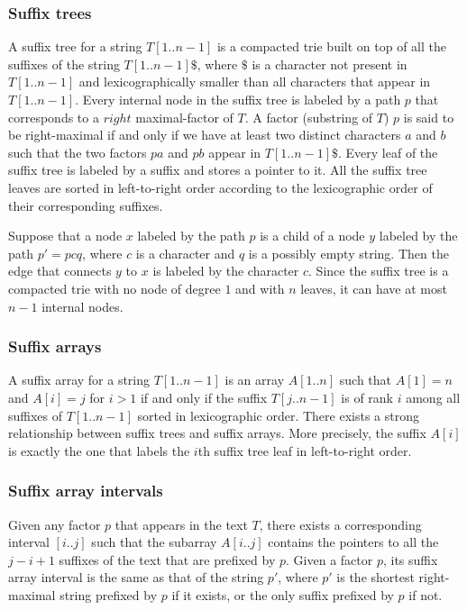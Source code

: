 \documentclass[a4paper]{article}
\begin{document}
\subsubsection{Suffix trees}
A suffix tree for a string $T[1..n-1]$ is a compacted trie built on top of all the suffixes of the string $T[1..n-1]\$$, where 
$\$$ is a character not present in $T[1..n-1]$ and lexicographically smaller than all characters that appear in $T[1..n-1]$. 
Every internal node in the suffix tree is labeled by a path $p$ that corresponds to a $right$ maximal-factor of $T$. 
A factor (substring of $T$) $p$ is said to be right-maximal if and only if we have at least two distinct characters $a$ and $b$ such that the two factors $pa$ and $pb$ appear in $T[1..n-1]\$$. 
Every leaf of the suffix tree is labeled by a suffix and stores a pointer to it. All the suffix tree leaves are sorted in 
left-to-right order according to the lexicographic order of their corresponding suffixes. 

Suppose that a node $x$ labeled by the path $p$ is a child of a node $y$ labeled by the path $p'=pcq$, where $c$ is a character and $q$ is a possibly empty string. Then the edge that connects $y$ to $x$ is labeled by the character $c$. 
Since the suffix tree is a compacted trie with no node of degree $1$ and with $n$ leaves, it can have at most $n-1$ internal nodes. 

\subsubsection{Suffix arrays}
A suffix array for a string $T[1..n-1]$ is an array $A[1..n]$ such that $A[1]=n$ and $A[i]=j$ for $i>1$ if and only if the suffix $T[j..n-1]$  is of rank $i$ among all suffixes of $T[1..n-1]$ sorted in lexicographic order. 
There exists a strong relationship between suffix trees and suffix arrays. More precisely, the suffix $A[i]$ is exactly the one that labels the $i$th suffix tree leaf in left-to-right order. 


\subsubsection{Suffix array intervals}
Given any factor $p$ that appears in the text $T$, there exists a corresponding interval $[i..j]$ such that the subarray $A[i..j]$ contains the pointers to all the $j-i+1$ suffixes of the text that are prefixed by $p$. Given a factor $p$, its suffix array interval is the same as that of the string $p'$, where $p'$ is the shortest right-maximal string prefixed by $p$ if it exists, or the only suffix prefixed by $p$ if not. 
\end{document}

